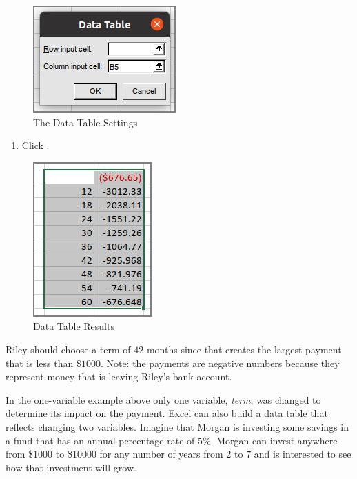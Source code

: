 \begin{figure}[H]
	\centering
	\includegraphics[width=\maxwidth{.95\linewidth}]{gfx/ch07_fig47}
	\caption{The Data Table Settings}
	\label{07:fig47}
\end{figure}

\begin{enumerate}[resume]	
	\item Click .
\end{enumerate}

\begin{figure}[H]
	\centering
	\includegraphics[width=\maxwidth{.95\linewidth}]{gfx/ch07_fig48}
	\caption{Data Table Results}
	\label{07:fig48}
\end{figure}

Riley should choose a term of $ 42 $ months since that creates the largest payment that is less than \$$ 1000 $. Note: the payments are negative numbers because they represent money that is leaving Riley's bank account.

In the one-variable example above only one variable, \textit{term}, was changed to determine its impact on the payment. Excel can also build a data table that reflects changing two variables. Imagine that Morgan is investing some savings in a fund that has an annual percentage rate of $ 5 $\%. Morgan can invest anywhere from \$$ 1000 $ to \$$ 10000 $ for any number of years from $ 2 $ to $ 7 $ and is interested to see how that investment will grow.

